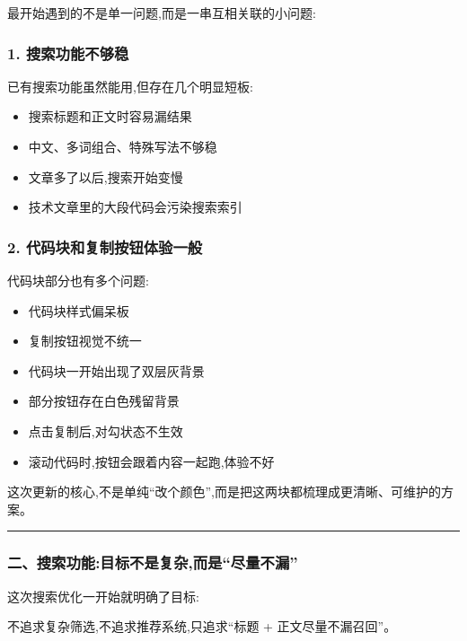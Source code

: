 \documentclass[lang=cn,scheme=chinese,color=blue,device=normal,toc=onecol,math=cm]{elegantbook}
\begin{document}
最开始遇到的不是单一问题,而是一串互相关联的小问题:\par


\subsubsection{1. 搜索功能不够稳}


已有搜索功能虽然能用,但存在几个明显短板:\par


\begin{itemize}
\item 搜索标题和正文时容易漏结果
\item 中文、多词组合、特殊写法不够稳
\item 文章多了以后,搜索开始变慢
\item 技术文章里的大段代码会污染搜索索引
\end{itemize}


\subsubsection{2. 代码块和复制按钮体验一般}


代码块部分也有多个问题:\par


\begin{itemize}
\item 代码块样式偏呆板
\item 复制按钮视觉不统一
\item 代码块一开始出现了双层灰背景
\item 部分按钮存在白色残留背景
\item 点击复制后,对勾状态不生效
\item 滚动代码时,按钮会跟着内容一起跑,体验不好
\end{itemize}


这次更新的核心,不是单纯“改个颜色”,而是把这两块都梳理成更清晰、可维护的方案。\par


\medskip\hrule\medskip


\subsubsection{二、搜索功能:目标不是复杂,而是“尽量不漏”}


这次搜索优化一开始就明确了目标:\par


\begin{quotebox}
不追求复杂筛选,不追求推荐系统,只追求“标题 + 正文尽量不漏召回”。\par
\end{quotebox}
\end{document}
